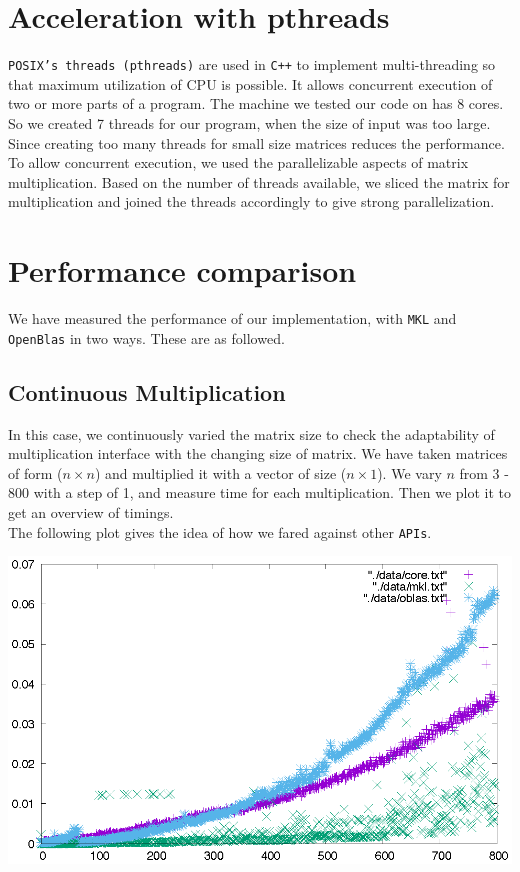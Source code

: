 \documentclass{article}
\begin{document}
    \section*{Acceleration with pthreads}
        \texttt{POSIX's threads (pthreads)} are used in \texttt{C++} to implement multi-threading so that maximum utilization of CPU is possible. It allows concurrent execution of two or more parts of a program. The machine we tested our code on has 8 cores. So we created 7 threads for our program, when the size of input was too large. Since creating too many threads for small size matrices reduces the performance.\\
        To allow concurrent execution, we used the parallelizable aspects of matrix multiplication. Based on the number of threads available, we sliced the matrix for multiplication and joined the threads accordingly to give strong parallelization.
        
    \section*{Performance comparison}
        We have measured the performance of our implementation, with \texttt{MKL} and \texttt{OpenBlas} in two ways. These are as followed.

        \subsection*{Continuous Multiplication}

            In this case, we continuously varied the matrix size to check the adaptability of multiplication interface with the changing size of matrix. We have taken matrices of form ($n \times n$) and multiplied it with a vector of size ($n \times 1$). We vary $n$ from 3 - 800 with a step of 1,  and measure time for each multiplication. Then we plot it to get an overview of timings. \\[2pt]
            The following plot gives the idea of how we fared against other \texttt{APIs}. \\[2pt]
            
            \begin{center}
                \includegraphics{./continuous.eps}
            \end{center}
        \pagebreak
\end{document}
